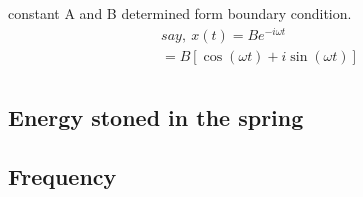 	constant A and B determined form boundary condition.
	\begin{align}
		say, \ x(t) = Be^{-i\omega t} \\
		= B[\cos(\omega t)+ i \sin(\omega t)] \\
	\end{align}
	
	
\subsection{Energy stoned in the spring}



\subsection{Frequency}






	









